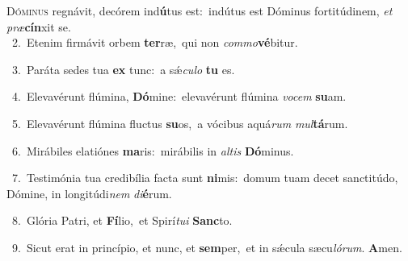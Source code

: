 \lettrine{\initial\textcolor{\initialcolor}{D}}{óminus} regnávit, decórem ind\-\textbf{ú}\-tus est:~\star indútus est Dóminus fortitúdinem, \textit{et} \textit{præ}\-\textbf{cín}xit se.\\
{\numbfont\textcolor{\numbcolor}{~2.}}~Etenim firmávit orbem \textbf{ter}\-ræ,~\star qui non \textit{com}\-\textit{mo}\textbf{vé}bitur.\par
{\numbfont\textcolor{\numbcolor}{~3.}}~Paráta sedes tua \textbf{ex} tunc:~\star a sǽ\-\textit{cu}\-\textit{lo} \textbf{tu} es.\par
{\numbfont\textcolor{\numbcolor}{~4.}}~Elevavérunt flúmina, \textbf{Dó}\-mine:~\star elevavérunt flúmina \textit{vo}\-\textit{cem} \textbf{su}\-am.\par
{\numbfont\textcolor{\numbcolor}{~5.}}~Elevavérunt flúmina fluctus \textbf{su}\-os,~\star a vócibus aquá\textit{rum} \textit{mul}\-\textbf{tá}rum.\par
{\numbfont\textcolor{\numbcolor}{~6.}}~Mirábiles elatiónes \textbf{ma}\-ris:~\star mirábilis in \textit{al}\-\textit{tis} \textbf{Dó}\-minus.\par
{\numbfont\textcolor{\numbcolor}{~7.}}~Testimónia tua credibília facta sunt \textbf{ni}\-mis:~\star domum tuam decet sanctitúdo, Dómine, in longitúdi\textit{nem} \textit{di}\-\textbf{é}rum.\par
{\numbfont\textcolor{\numbcolor}{~8.}}~Glória Patri, et \textbf{Fí}\-lio,~\star et Spirí\-\textit{tu}\-\textit{i} \textbf{Sanc}\-to.\par
{\numbfont\textcolor{\numbcolor}{~9.}}~Sicut erat in princípio, et nunc, et \textbf{sem}\-per,~\star et in sǽcula sæcu\-\textit{ló}\-\textit{rum}. \textbf{A}\-men.\par
